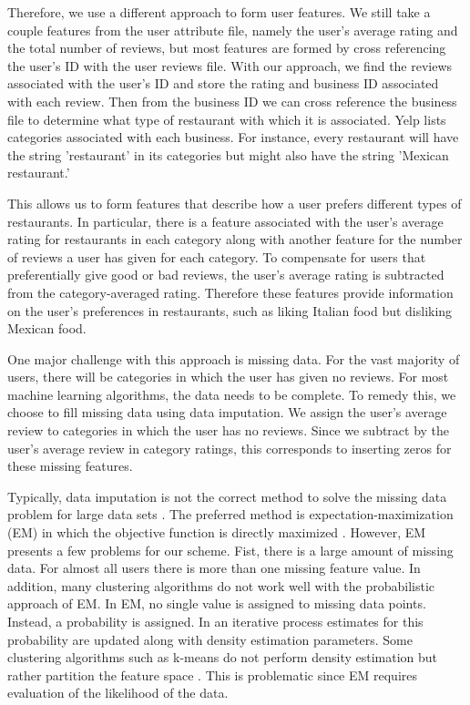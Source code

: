 \documentclass[11pt]{article}
\begin{document}
Therefore, we use a different approach to form user features. We still take a couple features from the user attribute file, namely the user's average rating and the total number of reviews, but most features are formed by cross referencing the user's ID with the user reviews file. With our approach, we find the reviews associated with the user's ID and store the rating and business ID associated with each review. Then from the business ID we can cross reference the business file to determine what type of restaurant with which it is associated.  Yelp lists categories associated with each business. For instance, every restaurant will have the string 'restaurant' in its categories but might also have the string 'Mexican restaurant.'

This allows us to form features that describe how a user prefers different types of restaurants. In particular, there is a feature associated with the user's average rating for restaurants in each category along with another feature for the number of reviews a user has given for each category. To compensate for users that preferentially give good or bad reviews, the user's average rating is subtracted from the category-averaged rating. Therefore these features provide information on the user's preferences in restaurants, such as liking Italian food but disliking Mexican food.

One major challenge with this approach is missing data. For the vast majority of users, there will be categories in which the user has given no reviews. For most machine learning algorithms, the data needs to be complete. To remedy this, we choose to fill missing data using data imputation. We assign the user's average review to categories in which the user has no reviews. Since we subtract by the user's average review in category ratings, this corresponds to inserting zeros for these missing features. 

Typically, data imputation is not the correct method to solve the missing data problem for large data sets \cite{em_vs_im}. The preferred method is expectation-maximization (EM) in which the objective function is directly maximized \cite{em}. However, EM presents a few problems for our scheme. Fist, there is a large amount of missing data. For almost all users there is more than one missing feature value. In addition, many clustering algorithms do not work well with the probabilistic approach of EM. In EM, no single value is assigned to missing data points. Instead, a probability is assigned. In an iterative process estimates for this probability are updated along with density estimation parameters. Some clustering algorithms such as k-means do not perform density estimation but rather partition the feature space \cite{kmeans}. This is problematic since EM requires evaluation of the likelihood of the data.
\end{document}
